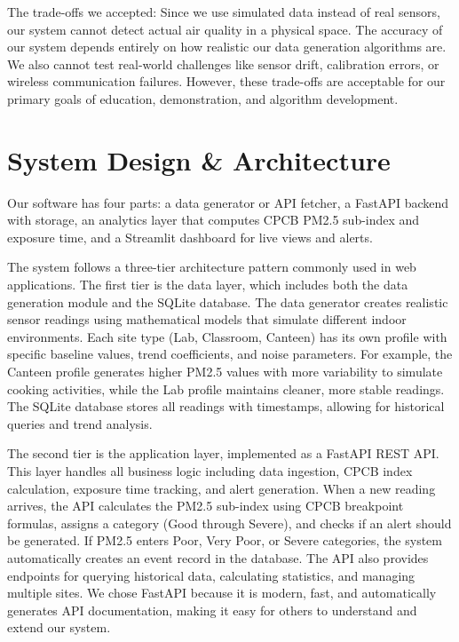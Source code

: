 \documentclass[12pt]{report}
\begin{document}
The trade-offs we accepted: Since we use simulated data instead of real sensors, our system cannot detect actual air quality in a physical space. The accuracy of our system depends entirely on how realistic our data generation algorithms are. We also cannot test real-world challenges like sensor drift, calibration errors, or wireless communication failures. However, these trade-offs are acceptable for our primary goals of education, demonstration, and algorithm development.

\section{System Design \& Architecture}
Our software has four parts: a data generator or API fetcher, a FastAPI backend with storage, an analytics layer that computes CPCB PM2.5 sub-index and exposure time, and a Streamlit dashboard for live views and alerts.\\

The system follows a three-tier architecture pattern commonly used in web applications. The first tier is the data layer, which includes both the data generation module and the SQLite database. The data generator creates realistic sensor readings using mathematical models that simulate different indoor environments. Each site type (Lab, Classroom, Canteen) has its own profile with specific baseline values, trend coefficients, and noise parameters. For example, the Canteen profile generates higher PM2.5 values with more variability to simulate cooking activities, while the Lab profile maintains cleaner, more stable readings. The SQLite database stores all readings with timestamps, allowing for historical queries and trend analysis.

The second tier is the application layer, implemented as a FastAPI REST API. This layer handles all business logic including data ingestion, CPCB index calculation, exposure time tracking, and alert generation. When a new reading arrives, the API calculates the PM2.5 sub-index using CPCB breakpoint formulas, assigns a category (Good through Severe), and checks if an alert should be generated. If PM2.5 enters Poor, Very Poor, or Severe categories, the system automatically creates an event record in the database. The API also provides endpoints for querying historical data, calculating statistics, and managing multiple sites. We chose FastAPI because it is modern, fast, and automatically generates API documentation, making it easy for others to understand and extend our system.
\end{document}
